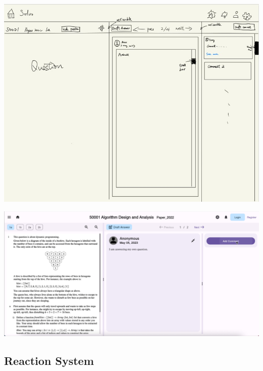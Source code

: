 \documentclass[a4paper]{article}
\begin{document}
    \noindent \begin{minipage}{0.4\textwidth}
                  \centering
                  \includegraphics[width=\textwidth]{concept1}
    \end{minipage}\hspace{0.05\textwidth}
    \begin{minipage}{0.57\textwidth}
        \centering
        \includegraphics[width=\textwidth]{question-page1}
    \end{minipage}

    \subsection*{Reaction System}
\end{document}
